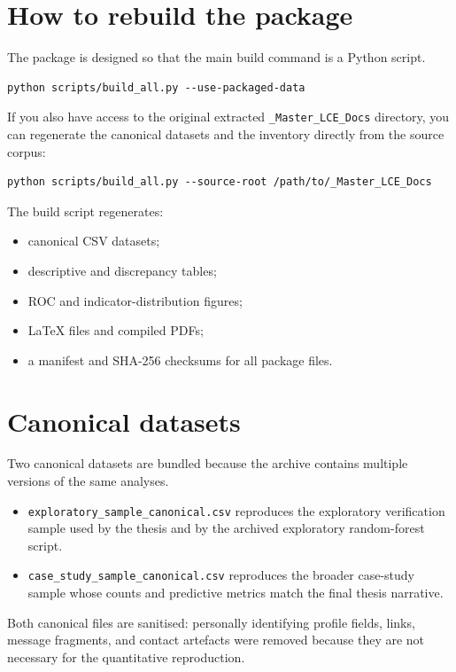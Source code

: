 \documentclass[11pt,a4paper]{article}
\begin{document}
\section{How to rebuild the package}
The package is designed so that the main build command is a Python script.

\begin{verbatim}
python scripts/build_all.py --use-packaged-data
\end{verbatim}

If you also have access to the original extracted \texttt{\_Master\_LCE\_Docs} directory, you can regenerate the canonical datasets and the inventory directly from the source corpus:

\begin{verbatim}
python scripts/build_all.py --source-root /path/to/_Master_LCE_Docs
\end{verbatim}

The build script regenerates:
\begin{itemize}[leftmargin=1.5em]
    \item canonical CSV datasets;
    \item descriptive and discrepancy tables;
    \item ROC and indicator-distribution figures;
    \item LaTeX files and compiled PDFs;
    \item a manifest and SHA-256 checksums for all package files.
\end{itemize}

\section{Canonical datasets}
Two canonical datasets are bundled because the archive contains multiple versions of the same analyses.
\begin{itemize}[leftmargin=1.5em]
    \item \texttt{exploratory\_sample\_canonical.csv} reproduces the exploratory verification sample used by the thesis and by the archived exploratory random-forest script.
    \item \texttt{case\_study\_sample\_canonical.csv} reproduces the broader case-study sample whose counts and predictive metrics match the final thesis narrative.
\end{itemize}

Both canonical files are sanitised: personally identifying profile fields, links, message fragments, and contact artefacts were removed because they are not necessary for the quantitative reproduction.
\end{document}
